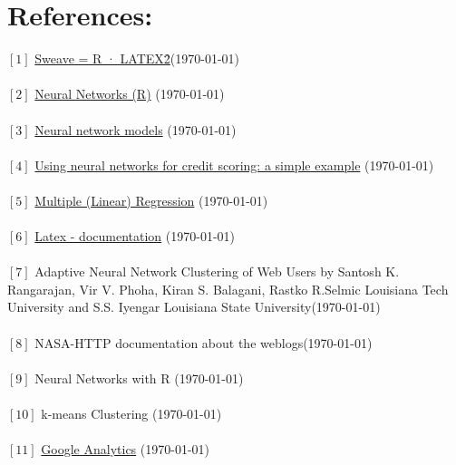 \documentclass[english]{article}
\begin{document}
\section{References:}
$[1]$ \href{http://gosset.wharton.upenn.edu/teaching/471/EPFL-Sweave-powerdot.pdf}{Sweave = R · LATEX\^2}(\today)\\\\
$[2]$ \href{http://scg.sdsu.edu/ann_r/}{Neural Networks (R)} (\today)\\\\
$[3]$ \href{https://www.otexts.org/fpp/9/3}{Neural network models} (\today)\\\\
$[4]$ \href{http://www.r-bloggers.com/using-neural-networks-for-credit-scoring-a-simple-example/}{Using neural networks for credit scoring: a simple example} (\today)\\\\
$[5]$ \href{http://www.statmethods.net/stats/regression.html}{Multiple (Linear) Regression} (\today)\\\\
$[6]$ \href{http://www.latex-project.org}{Latex - documentation} (\today)\\\\
$[7]$ Adaptive Neural Network Clustering of Web Users by Santosh K. Rangarajan, Vir V. Phoha, Kiran S. Balagani, Rastko R.Selmic Louisiana Tech University and S.S. Iyengar Louisiana State University(\today)\\\\
$[8]$ NASA-HTTP documentation about the weblogs(\today)\\\\
$[9]$ Neural Networks with R (\today)\\\\
$[10]$ k-means Clustering (\today)\\\\
$[11]$ \href{http://www.google.com/analytics/}{Google Analytics} (\today)\\\\
\newpage
\end{document}
